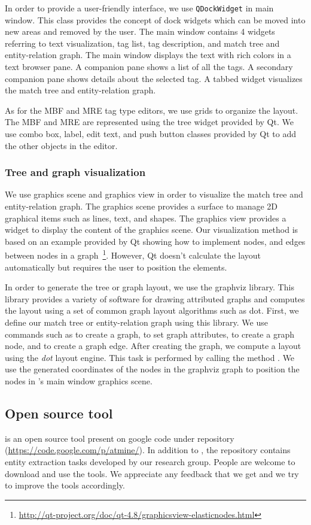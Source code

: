 In order to provide a user-friendly interface, we use {\tt QDockWidget} in \framework main window. 
This class provides the concept of dock widgets which can be moved into new areas and removed by the user. 
The main window contains 4 widgets referring to text visualization, 
tag list, tag description, and match tree and entity-relation graph. 
The main window displays the text with rich colors in a text browser pane. 
A companion pane shows a list of all the tags. 
A secondary companion pane shows details about the selected tag. 
A tabbed widget visualizes the match tree and entity-relation graph.

As for the MBF and MRE tag type editors, we use grids to organize the layout. 
The MBF and MRE are represented using the tree widget provided by Qt. 
We use combo box, label, edit text, and push button classes provided by Qt to 
add the other objects in the editor.

\subsubsection{Tree and graph visualization}

We use graphics scene and graphics view in order to visualize the match tree and entity-relation graph. 
The graphics scene provides a surface to manage 2D graphical items such as lines, text, and shapes. 
The graphics view provides a widget to display the content of the graphics scene. 
Our visualization method is based on an example provided by Qt showing how to implement nodes, and edges between nodes in a graph~\footnote{\url{http://qt-project.org/doc/qt-4.8/graphicsview-elasticnodes.html}}. 
However, Qt doesn't calculate the layout automatically but requires the user to position the elements.

In order to generate the tree or graph layout, we use the graphviz library. 
This library provides a variety of software for drawing attributed graphs and computes the layout using a set of common graph layout algorithms such as dot. 
First, we define our match tree or entity-relation graph using this library. 
We use commands such as  to create a graph,  to set graph attributes, 
 to create a graph node, and  to create a graph edge. 
After creating the graph, we compute a layout using the {\em dot} layout engine. 
This task is performed by calling the method . 
We use the generated coordinates of the nodes in the graphviz graph to position the nodes in \framework's main window graphics scene.

\subsection{Open source tool}

\framework is an open source tool present on google code under  repository (\url{https://code.google.com/p/atmine/}). 
In addition to \framework, the repository contains entity extraction tasks developed by our research group. 
People are welcome to download and use the tools. 
We appreciate any feedback that we get and we try to improve the tools accordingly.
